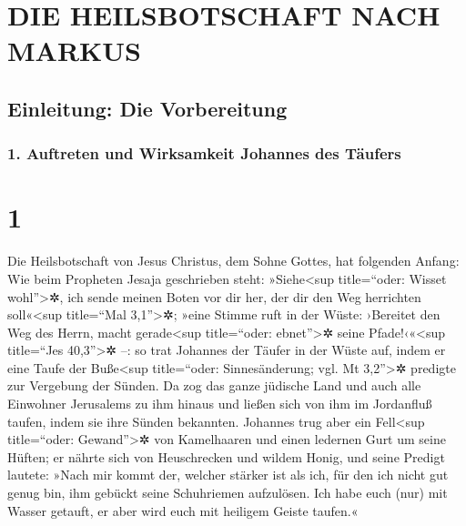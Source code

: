 \hypertarget{die-heilsbotschaft-nach-markus}{%
\section{DIE HEILSBOTSCHAFT NACH
MARKUS}\label{die-heilsbotschaft-nach-markus}}

\hypertarget{einleitung-die-vorbereitung}{%
\subsection{Einleitung: Die
Vorbereitung}\label{einleitung-die-vorbereitung}}

\hypertarget{auftreten-und-wirksamkeit-johannes-des-tuxe4ufers}{%
\subsubsection{1. Auftreten und Wirksamkeit Johannes des
Täufers}\label{auftreten-und-wirksamkeit-johannes-des-tuxe4ufers}}

\hypertarget{section}{%
\section{1}\label{section}}

 Die Heilsbotschaft von Jesus Christus, dem Sohne Gottes,
hat folgenden Anfang:  Wie beim Propheten Jesaja
geschrieben steht: »Siehe\textless sup title=``oder: Wisset
wohl''\textgreater✲, ich sende meinen Boten vor dir her, der dir den Weg
herrichten soll«\textless sup title=``Mal 3,1''\textgreater✲;
 »eine Stimme ruft in der Wüste: ›Bereitet den Weg des
Herrn, macht gerade\textless sup title=``oder: ebnet''\textgreater✲
seine Pfade!‹«\textless sup title=``Jes 40,3''\textgreater✲ --:
 so trat Johannes der Täufer in der Wüste auf, indem er
eine Taufe der Buße\textless sup title=``oder: Sinnesänderung; vgl. Mt
3,2''\textgreater✲ predigte zur Vergebung der Sünden.  Da
zog das ganze jüdische Land und auch alle Einwohner Jerusalems zu ihm
hinaus und ließen sich von ihm im Jordanfluß taufen, indem sie ihre
Sünden bekannten.  Johannes trug aber ein
Fell\textless sup title=``oder: Gewand''\textgreater✲ von Kamelhaaren
und einen ledernen Gurt um seine Hüften; er nährte sich von Heuschrecken
und wildem Honig,  und seine Predigt lautete: »Nach mir
kommt der, welcher stärker ist als ich, für den ich nicht gut genug bin,
ihm gebückt seine Schuhriemen aufzulösen.  Ich habe euch
(nur) mit Wasser getauft, er aber wird euch mit heiligem Geiste taufen.«

